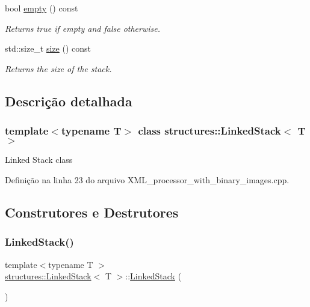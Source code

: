 \begin{DoxyCompactItemize}
bool \mbox{\hyperlink{classstructures_1_1LinkedStack_ac9704fd697f9c4ed4f7fc4e786114e4f}{empty}} () const
\begin{DoxyCompactList}\small\item\em Returns true if empty and false otherwise. \end{DoxyCompactList}\item 
std\+::size\+\_\+t \mbox{\hyperlink{classstructures_1_1LinkedStack_ae1ca6a5a9b837471863f1c8bb23cfe1d}{size}} () const
\begin{DoxyCompactList}\small\item\em Returns the size of the stack. \end{DoxyCompactList}\end{DoxyCompactItemize}


\subsection{Descrição detalhada}
\subsubsection*{template$<$typename T$>$\newline
class structures\+::\+Linked\+Stack$<$ T $>$}

Linked Stack class 

Definição na linha 23 do arquivo X\+M\+L\+\_\+processor\+\_\+with\+\_\+binary\+\_\+images.\+cpp.



\subsection{Construtores e Destrutores}
\mbox{\label{classstructures_1_1LinkedStack_a546b827cccaa49b4f470110bc3a9004e}} 
\subsubsection{\texorpdfstring{Linked\+Stack()}{LinkedStack()}}
{\footnotesize\ttfamily template$<$typename T $>$ \\
\mbox{\hyperlink{classstructures_1_1LinkedStack}{structures\+::\+Linked\+Stack}}$<$ T $>$\+::\mbox{\hyperlink{classstructures_1_1LinkedStack}{Linked\+Stack}} (\begin{DoxyParamCaption}{ }\end{DoxyParamCaption})}



